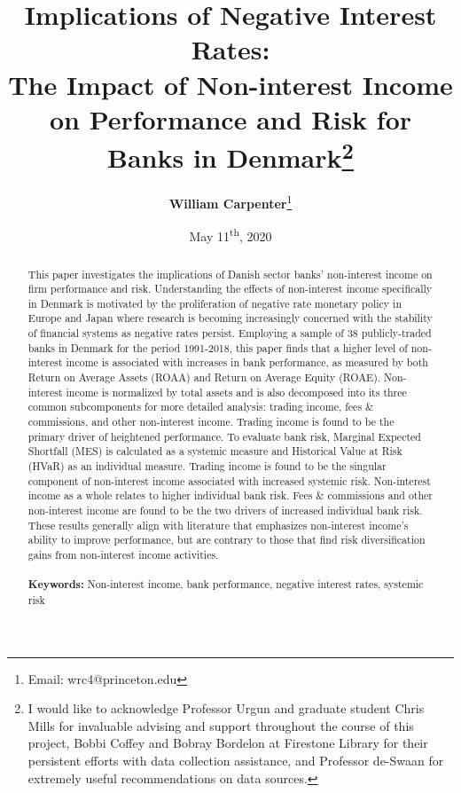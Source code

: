 \documentclass[10pt]{article} %
\begin{document}
\title{Implications of Negative Interest Rates: \\ The Impact of Non-interest Income on Performance and Risk for Banks in Denmark\footnote{I would like to acknowledge Professor Urgun and graduate student Chris Mills for invaluable advising and support throughout the course of this project, Bobbi Coffey and Bobray Bordelon at Firestone Library for their persistent efforts with data collection assistance, and Professor de-Swaan for extremely useful recommendations on data sources.}}
\vspace{2em}
\author{\textbf{William Carpenter}\footnote{Email: wrc4@princeton.edu}}
\date{May 11\textsuperscript{th}, 2020}
\maketitle 
\vspace{0.3em}
\begin{abstract}
    This paper investigates the implications of Danish sector banks' non-interest income on firm performance and risk. Understanding the effects of non-interest income specifically in Denmark is motivated by the proliferation of negative rate monetary policy in Europe and Japan where research is becoming increasingly concerned with the stability of financial systems as negative rates persist. Employing a sample of 38 publicly-traded banks in Denmark for the period 1991-2018, this paper finds that a higher level of non-interest income is associated with increases in bank performance, as measured by both Return on Average Assets (ROAA) and Return on Average Equity (ROAE). Non-interest income is normalized by total assets and is also decomposed into its three common subcomponents for more detailed analysis: trading income, fees \& commissions, and other non-interest income. Trading income is found to be the primary driver of heightened performance. To evaluate bank risk, Marginal Expected Shortfall (MES) is calculated as a systemic measure and Historical Value at Risk (HVaR) as an individual measure. Trading income is found to be the singular component of non-interest income associated with increased systemic risk. Non-interest income as a whole relates to higher individual bank risk. Fees \& commissions and other non-interest income are found to be the two drivers of increased individual bank risk. These results generally align with literature that emphasizes non-interest income's ability to improve performance, but are contrary to those that find risk diversification gains from non-interest income activities. 
    \\ \\
      \normalsize{\textbf{Keywords:} Non-interest income, bank performance, negative interest rates, systemic risk} \\ 
\end{abstract}
\vspace{3.5em}
\thispagestyle{empty}
\newpage
\end{document}
